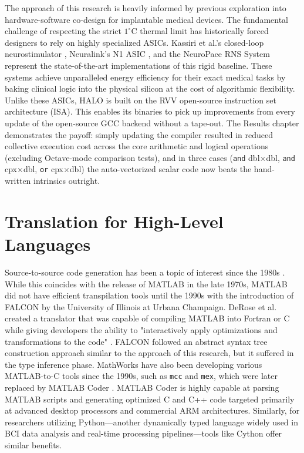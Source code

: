 
The approach of this research is heavily informed by previous exploration into hardware-software co-design for implantable medical devices. The fundamental challenge of respecting the strict $1^\circ$C thermal limit has historically forced designers to rely on highly specialized ASICs. Kassiri et al.'s closed-loop neurostimulator \cite{7982670}, Neuralink's N1 ASIC \cite{Musk2019}, and the NeuroPace RNS System \cite{Heck2014} represent the state-of-the-art implementations of this rigid baseline. These systems achieve unparalleled energy efficiency for their exact medical tasks by baking clinical logic into the physical silicon at the cost of algorithmic flexibility. Unlike these ASICs, HALO is built on the RVV open-source instruction set architecture (ISA). This enables its binaries to pick up improvements from every update of the open-source GCC backend without a tape-out. The Results chapter demonstrates the payoff: simply updating the compiler resulted in reduced collective execution cost across the core arithmetic and logical operations (excluding Octave-mode comparison tests), and in three cases (\texttt{and} dbl$\times$dbl, \texttt{and} cpx$\times$dbl, \texttt{or} cpx$\times$dbl) the auto-vectorized scalar code now beats the hand-written intrinsics outright.

\section{Translation for High-Level Languages}


Source-to-source code generation has been a topic of interest since the 1980s \cite{taylor1982upward}. While this coincides with the release of MATLAB in the late 1970s, MATLAB did not have efficient transpilation tools until the 1990s with the introduction of FALCON by the University of Illinois at Urbana Champaign. DeRose et al. created a translator that was capable of compiling MATLAB into Fortran or C while giving developers the ability to "interactively apply optimizations and transformations to the code" \cite{derose1996falcon}. FALCON followed an abstract syntax tree construction approach similar to the approach of this research, but it suffered in the type inference phase. MathWorks have also been developing various MATLAB-to-C tools since the 1990s, such as \texttt{mcc} and \texttt{mex}, which were later replaced by MATLAB Coder \cite{mathworks_matlab_coder}. MATLAB Coder is highly capable at parsing MATLAB scripts and generating optimized C and C++ code targeted primarily at advanced desktop processors and commercial ARM architectures. Similarly, for researchers utilizing Python---another dynamically typed language widely used in BCI data analysis and real-time processing pipelines---tools like Cython \cite{behnel2011cython} offer similar benefits.

